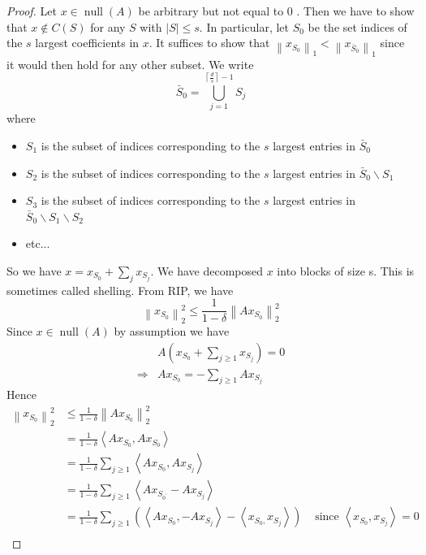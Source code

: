 \documentclass[11pt]{article}
\begin{document}
\begin{problem}
\begin{proof}
Let $x \in \operatorname{null}(A)$ be arbitrary but not equal to 0 . Then we have to show that $x \notin C(S)$ for any $S$ with $|S| \leqslant s$. In particular, let $S_{0}$ be the set indices of the $s$ largest coefficients in $x$. It suffices to show that $\left\|x_{S_{0}}\right\|_{1}<\left\|x_{\bar{S}_{0}}\right\|_{1}$ since it would then hold for any other subset.
We write
$$
\bar{S}_{0}=\bigcup_{j=1}^{\left\lceil\frac{d}{s}\right\rceil-1} S_{j}
$$
where
\begin{itemize}
    \item $S_{1}$ is the subset of indices corresponding to the $s$ largest entries in $\bar{S}_{0}$
    \item $S_{2}$ is the subset of indices corresponding to the $s$ largest entries in $\bar{S}_{0} \backslash S_{1}$
    \item $S_{3}$ is the subset of indices corresponding to the $s$ largest entries in $\bar{S}_{0} \backslash S_{1} \backslash S_{2}$
    \item etc...
\end{itemize}
So we have $x=x_{S_{0}}+\sum_{j} x_{S_{j}}$. We have decomposed $x$ into blocks of size s. This is sometimes called shelling. From RIP, we have
$$
\left\|x_{S_{0}}\right\|_{2}^{2} \leqslant \frac{1}{1-\delta}\left\|A x_{S_{0}}\right\|_{2}^{2}
$$
Since $x \in \operatorname{null}(A)$ by assumption we have
$$
\begin{aligned}
& A\left(x_{S_{0}}+\sum_{j \geqslant 1} x_{S_{j}}\right)=0 \\
\Longrightarrow & A x_{S_{0}}=-\sum_{j \geqslant 1} A x_{S_{j}}
\end{aligned}
$$   
Hence
$$
\begin{aligned}
\left\|x_{S_{0}}\right\|_{2}^{2} & \leqslant \frac{1}{1-\delta}\left\|A x_{S_{0}}\right\|_{2}^{2} & \\
& =\frac{1}{1-\delta}\left\langle A x_{S_{0}}, A x_{S_{0}}\right\rangle & \\
& =\frac{1}{1-\delta} \sum_{j \geqslant 1}\left\langle A x_{S_{0}}, A x_{S_{j}}\right\rangle & \\
& =\frac{1}{1-\delta} \sum_{j \geqslant 1}\left\langle A x_{S_{0^{\prime}}}-A x_{S_{j}}\right\rangle & \\
& =\frac{1}{1-\delta} \sum_{j \geqslant 1}\left(\left\langle A x_{S_{0}},-A x_{S_{j}}\right\rangle-\left\langle x_{S_{0},} x_{S_{j}}\right\rangle\right) & \text { since }\left\langle x_{S_{0}}, x_{S_{j}}\right\rangle=0 \\

\end{aligned}$$
\end{proof}
\end{problem}
\end{document}
